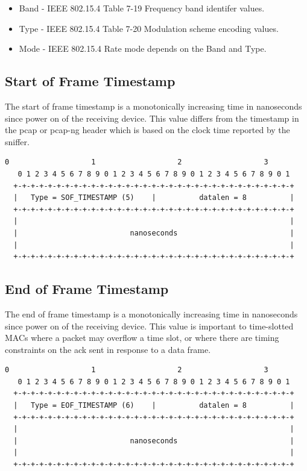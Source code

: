 \documentclass[12pt]{article}
\renewcommand\_{\textunderscore\allowbreak}
\begin{document}
\begin{itemize}
    \item Band - IEEE 802.15.4 Table 7-19 Frequency band identifer values.
    \item Type - IEEE 802.15.4 Table 7-20 Modulation scheme encoding values.
    \item Mode - IEEE 802.15.4 Rate mode depends on the Band and Type.
\end{itemize}

\newpage
\subsection{Start of Frame Timestamp}

The start of frame timestamp is a monotonically increasing time in nanoseconds
since power on of the receiving device.  This value differs from the timestamp
in the pcap or pcap-ng header which is based on the clock time reported by the
sniffer.

\begin{Verbatim}[samepage=true]
   0                   1                   2                   3
   0 1 2 3 4 5 6 7 8 9 0 1 2 3 4 5 6 7 8 9 0 1 2 3 4 5 6 7 8 9 0 1
  +-+-+-+-+-+-+-+-+-+-+-+-+-+-+-+-+-+-+-+-+-+-+-+-+-+-+-+-+-+-+-+-+
  |   Type = SOF_TIMESTAMP (5)    |          datalen = 8          |
  +-+-+-+-+-+-+-+-+-+-+-+-+-+-+-+-+-+-+-+-+-+-+-+-+-+-+-+-+-+-+-+-+
  |                                                               |
  |                          nanoseconds                          |
  |                                                               |
  +-+-+-+-+-+-+-+-+-+-+-+-+-+-+-+-+-+-+-+-+-+-+-+-+-+-+-+-+-+-+-+-+
\end{Verbatim}

\subsection{End of Frame Timestamp}

The end of frame timestamp is a monotonically increasing time in nanoseconds
since power on of the receiving device.  This value is important to
time-slotted MACs where a packet may overflow a time slot, or where there are
timing constraints on the ack sent in response to a data frame.

\begin{Verbatim}[samepage=true]
   0                   1                   2                   3
   0 1 2 3 4 5 6 7 8 9 0 1 2 3 4 5 6 7 8 9 0 1 2 3 4 5 6 7 8 9 0 1
  +-+-+-+-+-+-+-+-+-+-+-+-+-+-+-+-+-+-+-+-+-+-+-+-+-+-+-+-+-+-+-+-+
  |   Type = EOF_TIMESTAMP (6)    |          datalen = 8          |
  +-+-+-+-+-+-+-+-+-+-+-+-+-+-+-+-+-+-+-+-+-+-+-+-+-+-+-+-+-+-+-+-+
  |                                                               |
  |                          nanoseconds                          |
  |                                                               |
  +-+-+-+-+-+-+-+-+-+-+-+-+-+-+-+-+-+-+-+-+-+-+-+-+-+-+-+-+-+-+-+-+
\end{Verbatim}
\end{document}
